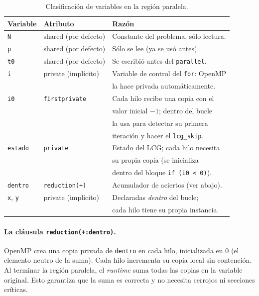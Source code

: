 \documentclass[12pt,a4paper]{article}
\begin{document}
\begin{table}[ht]
  \centering
  \caption{Clasificaci\'on de variables en la regi\'on paralela.}
  \label{tab:sharing}
  \begin{tabular}{lll}
    \toprule
    Variable & Atributo & Raz\'on \\
    \midrule
    \texttt{N}       & shared (por defecto) & Constante del problema, s\'olo lectura. \\
    \texttt{p}       & shared (por defecto) & S\'olo se lee (ya se us\'o antes). \\
    \texttt{t0}      & shared (por defecto) & Se escribi\'o antes del \texttt{parallel}. \\
    \texttt{i}       & private (impl\'icito) & Variable de control del \texttt{for}: OpenMP \\
                     &                       & la hace privada autom\'aticamente. \\
    \texttt{i0}      & \texttt{firstprivate}  & Cada hilo recibe una copia con el \\
                     &                       & valor inicial $-1$; dentro del bucle \\
                     &                       & la usa para detectar su primera \\
                     &                       & iteraci\'on y hacer el \texttt{lcg\_skip}. \\
    \texttt{estado}  & \texttt{private}       & Estado del LCG; cada hilo necesita \\
                     &                       & su propia copia (se inicializa \\
                     &                       & dentro del bloque \texttt{if (i0 < 0)}). \\
    \texttt{dentro}  & \texttt{reduction(+)}  & Acumulador de aciertos (ver abajo). \\
    \texttt{x}, \texttt{y} & private (impl\'icito) & Declaradas \emph{dentro} del bucle; \\
                     &                       & cada hilo tiene su propia instancia. \\
    \bottomrule
  \end{tabular}
\end{table}

\paragraph{La cl\'ausula \texttt{reduction(+:dentro)}.}
OpenMP crea una copia privada de \texttt{dentro} en cada hilo, inicializada en $0$ (el elemento neutro de la suma). Cada hilo incrementa su copia local sin contenci\'on. Al terminar la regi\'on paralela, el \emph{runtime} suma todas las copias en la variable original. Esto garantiza que la suma es correcta y no necesita cerrojos ni secciones cr\'iticas.
\end{document}
